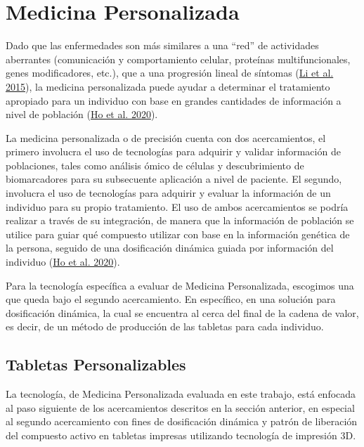 \documentclass[
]{book}
\begin{document}
\newpage

\hypertarget{medicina-personalizada}{%
\section{Medicina Personalizada}\label{medicina-personalizada}}

Dado que las enfermedades son más similares a una ``red'' de actividades
aberrantes (comunicación y comportamiento celular, proteínas
multifuncionales, genes modificadores, etc.), que a una progresión
lineal de síntomas (\protect\hyperlink{ref-Li2015}{Li et al. 2015}), la medicina personalizada puede ayudar a
determinar el tratamiento apropiado para un individuo con base en
grandes cantidades de información a nivel de población (\protect\hyperlink{ref-Ho2020}{Ho et al. 2020}).

La medicina personalizada o de precisión cuenta con dos acercamientos,
el primero involucra el uso de tecnologías para adquirir y validar
información de poblaciones, tales como análisis ómico de células y
descubrimiento de biomarcadores para su subsecuente aplicación a nivel
de paciente. El segundo, involucra el uso de tecnologías para adquirir y
evaluar la información de un individuo para su propio tratamiento. El
uso de ambos acercamientos se podría realizar a través de su
integración, de manera que la información de población se utilice para
guiar qué compuesto utilizar con base en la información genética de la
persona, seguido de una dosificación dinámica guiada por información del
individuo (\protect\hyperlink{ref-Ho2020}{Ho et al. 2020}).

Para la tecnología específica a evaluar de Medicina Personalizada,
escogimos una que queda bajo el segundo acercamiento. En específico, en
una solución para dosificación dinámica, la cual se encuentra al cerca
del final de la cadena de valor, es decir, de un método de producción de
las tabletas para cada individuo.

\hypertarget{tabletas-personalizables}{%
\subsection{Tabletas Personalizables}\label{tabletas-personalizables}}

La tecnología, de Medicina Personalizada evaluada en este trabajo, está
enfocada al paso siguiente de los acercamientos descritos en la sección
anterior, en especial al segundo acercamiento con fines de dosificación
dinámica y patrón de liberación del compuesto activo en tabletas
impresas utilizando tecnología de impresión 3D.
\end{document}
